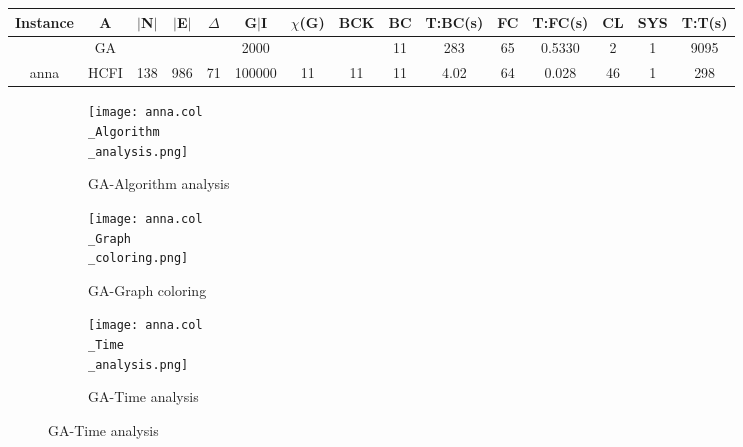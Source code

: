 \documentclass[10pt]{article}
\begin{document}
\begin{table}[H]
\centering
\begin{tabular}{|c|c|c|c|c|c|c|c|c|c|c|c|c|c|c|}
\hline
Instance& A &$|$N$|$ & $|$E$|$ & $\Delta$ & G$|$I & $\chi$(G) &BCK&BC & T:BC(s) & FC & T:FC(s) & CL & SYS & T:T(s) \\ \hline \hline
&GA&       &                   &                     & 2000        &     \cellcolor{yellow} & {\cellcolor{yellow}}& {{\cellcolor{green}11}}
&283   &65        & 0.5330                  &2                    &1          &9095        \\ \cline{2-2} \cline{6-6} \cline{9-15}
 \multirow{-2}{*}{anna} &HCFI   &\multirow{-2}{*}{138}   &\multirow{-2}{*}{986}     &\multirow{-2}{*}{71}     &100000     &\multirow{-2}{*}{\cellcolor{yellow}11}      & \multirow{-2}{*}{\cellcolor{yellow}11}    &{\cellcolor{green}11}     &4.02         &64    &0.028         &46    &1     &298        \\ \hline 
\end{tabular}
\end{table}

\graphicspath{{./Core1/Solutions/GA/anna.col}}
\begin{figure}[H]
\begin{subfigure}{.33\textwidth}
  \centering
  \texttt{[image: anna.col\\\_Algorithm\\\_analysis.png]}
  \caption{GA-Algorithm analysis}
   \label{fig:subfig1}
\end{subfigure}%
\begin{subfigure}{.33\textwidth}
  \centering
  \texttt{[image: anna.col\\\_Graph\\\_coloring.png]}
  \caption{GA-Graph coloring}
  \label{fig:subfig2}
\end{subfigure}
\begin{subfigure}{.33\textwidth}
  \centering
  \texttt{[image: anna.col\\\_Time\\\_analysis.png]}
  \caption{GA-Time analysis}
  \end{subfigure}
\end{figure}
\end{document}
